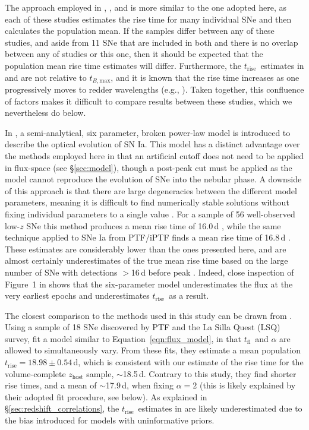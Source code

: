 \documentclass[twocolumn]{./aastex63}
\newcommand{\tfl}{$t_\mathrm{fl}$}
\newcommand{\trise}{$t_\mathrm{rise}$}
\newcommand{\tbmax}{$t_{B,\mathrm{max}}$}
\begin{document}
The approach employed in \citet{Zheng17a}, \citet{Papadogiannakis19}, and
\citet{Firth15} is more similar to the one adopted here, as each of these
studies estimates the rise time for many individual SNe and then calculates the
population mean. If the samples differ between any of these studies, and aside
from 11 SNe that are included in both \citet{Papadogiannakis19} and
\citet{Firth15} there is no overlap between any of studies or this one, then it
should be expected that the population mean rise time estimates will differ.
Furthermore, the \trise\ estimates in \citet{Papadogiannakis19} and
\citet{Firth15} are not relative to \tbmax, and it is known that the rise time
increases as one progressively moves to redder wavelengths (e.g.,
\citealt{Ganeshalingam11}). Taken together, this confluence of factors makes it
difficult to compare results between these studies, which we nevertheless do
below.

In \citet{Zheng17}, a semi-analytical, six parameter, broken power-law model is
introduced to describe the optical evolution of SN Ia. This model has a distinct
advantage over the methods employed here in that an artificial cutoff does not
need to be applied in flux-space (see \S\ref{sec:model}), though a post-peak cut
must be applied as the model cannot reproduce the evolution of SNe into the
nebular phase. A downside of this approach is that there are large degeneracies
between the different model parameters, meaning it is difficult to find
numerically stable solutions without fixing individual parameters to a single
value \citep{Zheng17a}. For a sample of 56 well-observed low-$z$ SNe this method
produces a mean rise time of 16.0\,d \citep{Zheng17a}, while the same technique
applied to SNe Ia from PTF/iPTF finds a mean rise time of 16.8\,d
\citep{Papadogiannakis19}. These estimates are considerably lower than the ones
presented here, and are almost certainly underestimates of the true mean rise
time based on the large number of SNe with detections $>$16\,d before peak
\citep{Papadogiannakis19, Yao19}. Indeed, close inspection of Figure~1 in
\citet{Zheng17a} shows that the six-parameter model underestimates the flux at
the very earliest epochs and underestimates \trise\ as a result.

The closest comparison to the methods used in this study can be drawn from
\citet{Firth15}. Using a sample of 18 SNe discovered by PTF and the La Silla
Quest (LSQ) survey, \citeauthor{Firth15} fit a model similar to
Equation~\ref{eqn:flux_model}, in that \tfl\ and $\alpha$ are allowed to
simultaneously vary. From these fits, they estimate a mean population \trise$ =
18.98 \pm 0.54$\,d, which is consistent with our estimate of the rise time for
the volume-complete $z_\mathrm{host}$ sample, $\sim$18.5\,d. Contrary to this
study, they find shorter rise times, and a mean of $\sim$17.9\,d, when fixing
$\alpha = 2$ (this is likely explained by their adopted fit procedure, see
below). As explained in \S\ref{sec:redshift_correlations}, the \trise\ estimates
in \citet{Firth15} are likely underestimated due to the bias introduced for
models with uninformative priors.
\end{document}
